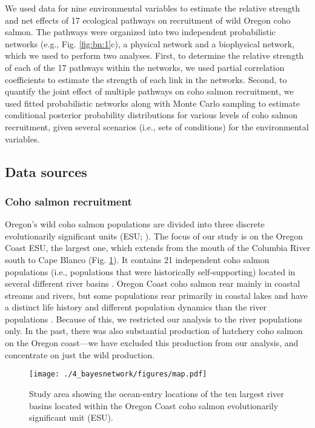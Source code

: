 We used data for nine environmental variables to estimate the relative strength
and net effects of 17 ecological pathways on recruitment of wild Oregon coho
salmon. The pathways were organized into two independent probabilistic networks
(e.g., Fig. \ref{fig:bn:1}c), a physical network and a biophysical network,
which we used to perform two analyses. First, to determine the relative strength
of each of the 17 pathways within the networks, we used partial correlation
coefficients to estimate the strength of each link in the networks. Second, to
quantify the joint effect of multiple pathways on coho salmon recruitment, we
used fitted probabilistic networks along with Monte Carlo sampling to estimate
conditional posterior probability distributions for various levels of coho
salmon recruitment, given several scenarios (i.e., sets of conditions) for the
environmental variables.


\subsection{Data sources}

\subsubsection{Coho salmon recruitment}

Oregon's wild coho salmon populations are divided into three discrete
evolutionarily significant units (ESU; \citealp{Weitkamp1995a, Lawson2007a}). The
focus of our study is on the Oregon Coast ESU, the largest one, which extends
from the mouth of the Columbia River south to Cape Blanco (Fig. \ref{fig:bn:2}).
It contains 21 independent coho salmon populations (i.e., populations that were
historically self-supporting) located in several different river basins
\citep{Lawson2007a}. Oregon Coast coho salmon rear mainly in coastal streams and
rivers, but some populations rear primarily in coastal lakes and have a distinct
life history and different population dynamics than the river populations
\citep{Lawson2004, PFMC2013}. Because of this, we restricted our analysis to the
river populations only. In the past, there was also substantial production of
hatchery coho salmon on the Oregon coast---we have excluded this production
from our analysis, and concentrate on just the wild production.

\begin{figure}[htbp]
  \centering \texttt{[image: ./4\_bayesnetwork/figures/map.pdf]}
  \caption[Study area showing the ocean-entry locations of the ten largest river
           basins in the Oregon Coast evolutionarily significant unit]{Study
           area showing the ocean-entry locations of the ten largest river
           basins located within the Oregon Coast coho salmon evolutionarily
           significant unit (ESU).}
  \label{fig:bn:2}
\end{figure}

